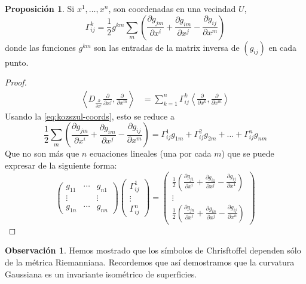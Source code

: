 \documentclass[spanish]{book}
\theoremstyle{definition}
\newtheorem*{prop}{Proposición}
\newtheorem*{obs}{Observación}
\begin{document}
	\begin{prop}
		Si $x^1,\ldots,x^n$, son coordenadas en una vecindad $U$,
		\[\Gamma_{ij}^k = \frac{1}{2} g^{km}\sum_m \left( \frac{\partial g_{jm}}{\partial x^i} + \frac{\partial g_{im}}{\partial x^j} - \frac{\partial g_{ij}}{\partial x^m} \right)\]
		donde las funciones $g^{km}$ son las entradas de la matrix inversa de $(g_{ij})$ en cada punto.
	\end{prop}
	\begin{proof}
		\begin{align*}
			\left\langle D_{\frac{\partial}{\partial x^i}}\frac{\partial}{\partial x^j},\frac{\partial}{\partial x^m}\right\rangle&=\sum_{k=1}^n\Gamma_{ij}^k\left\langle\frac{\partial}{\partial x^k},\frac{\partial}{\partial x^m}\right\rangle
		\end{align*}
		Usando la \cref{eq:kozszul-coords}, esto se reduce a
			\[\frac{1}{2} \sum_m \left( \frac{\partial g_{jm}}{\partial x^i} + \frac{\partial g_{im}}{\partial x^j} - \frac{\partial g_{ij}}{\partial x^m} \right)=\Gamma_{ij}^1g_{1m}+\Gamma^2_{ij}g_{2m}+\ldots+\Gamma_{ij}^ng_{nm}\]
		Que no son más que $n$ ecuaciones lineales (una por cada $m$) que se puede expresar de la siguiente forma:
		\[\begin{pmatrix}
			g_{11}&\cdots&g_{n1}\\
			\vdots&&\vdots\\
			g_{1n}&\cdots&g_{nn}
		\end{pmatrix}\begin{pmatrix}
		\Gamma_{ij}^1\\
		\vdots\\
		\Gamma_{ij}^n
		\end{pmatrix}=\begin{pmatrix}
		\frac{1}{2}\left( \frac{\partial g_{j1}}{\partial x^i} + \frac{\partial g_{i1}}{\partial x^j} - \frac{\partial g_{ij}}{\partial x^1} \right)\\
		\vdots\\
		\frac{1}{2} \left( \frac{\partial g_{jn}}{\partial x^i} + \frac{\partial g_{in}}{\partial x^j} - \frac{\partial g_{ij}}{\partial x^n} \right)
		\end{pmatrix}\]
	\end{proof}
	\begin{obs}
		Hemos mostrado que los símbolos de Chrisftoffel dependen sólo de la métrica Riemanniana. Recordemos que así demostramos que la curvatura Gaussiana es un invariante isométrico de superficies.
	\end{obs}
	
\end{document}
